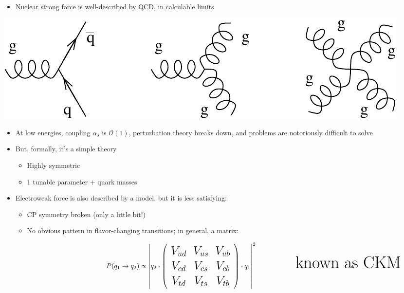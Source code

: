 \documentclass[landscape]{article}
\newenvironment{slide}[1][ ]{\mbox{\bf \boldmath #1 } \vfill}{\vfill \vspace{-1.5 cm} \mbox{ } \pagebreak}
\newenvironment{itemizer}[1]{\begin{itemize}\setlength{\itemsep}{#1}}{\end{itemize}}
\begin{document}
\begin{slide}

\begin{minipage}{0.6\linewidth}
  \begin{itemize}
    \item Nuclear strong force is well-described by QCD, in calculable limits
  \end{itemize}
\end{minipage} \hfill \begin{minipage}{0.35\linewidth}
  \includegraphics[width=\linewidth]{../diagram_qcd}
\end{minipage}

\vspace{0.5 cm}
\begin{itemizer}{0.5 cm}

  \item At low energies, coupling $\alpha_s$ is $\mathcal{O}(1)$,
  perturbation theory breaks down, and problems are notoriously
  difficult to solve

  \item But, formally, it's a simple theory

    \begin{itemizer}{0.5 cm}

      \item Highly symmetric

      \item 1 tunable parameter $+$ quark masses

    \end{itemizer}

  \item Electroweak force is also described by a model, but it is less satisfying:

    \begin{itemizer}{0.5 cm}

      \item CP symmetry broken (only a little bit!)

      \item No obvious pattern in flavor-changing transitions; in general, a matrix:

\[ \LARGE \hspace{3 cm} P(q_1 \to q_2) \propto \left| q_2 \cdot \left(\begin{array}{c c c} V_{ud} & V_{us} & V_{ub} \\ V_{cd} & V_{cs} & V_{cb} \\ V_{td} & V_{ts} & V_{tb} \end{array} \right) \cdot q_1 \right|^2 \hspace{2 cm} \mbox{\Huge known as CKM} \]


\end{itemizer}
\end{itemizer}
\end{slide}
\end{document}
